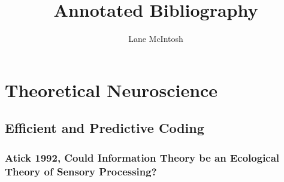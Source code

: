 \documentclass{article}
\begin{document}
\title{Annotated Bibliography}
\author{Lane McIntosh}
\maketitle
\tableofcontents

\section{Theoretical Neuroscience}
\subsection{Efficient and Predictive Coding}
\subsubsection{Atick 1992, Could Information Theory be an Ecological Theory of Sensory Processing?}
\end{document}
